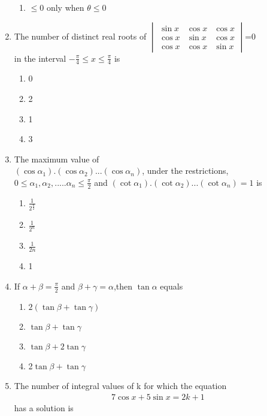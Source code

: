 \begin{enumerate}[label=\arabic*.,ref=\thesubsection.\theenumi]
\begin{enumerate}
       \item $\leq0$ only when $\theta\leq0$
   \end{enumerate}
   \item The number of distinct real roots of 
   $\begin{vmatrix}
   \sin{x} & \cos{x}  & \cos{x} \\ \cos{x} & \sin{x} & \cos{x} \\ \cos{x} & \cos{x} & \sin{x} 
   \end{vmatrix}$=0 \\
   in the interval $-\frac{\pi}{4}\leq x\leq \frac{\pi}{4}$ is 
   \begin{enumerate}
       \item 0
       \item 2
       \item 1
       \item 3
   \end{enumerate}
   \item The  maximum value of\\ $(\cos{\alpha_1}).(\cos{\alpha_2})...(\cos{\alpha_n})$, under the restrictions,
   $0\leq\alpha_1,\alpha_2,.....\alpha_n\leq{\frac{\pi}{2}}$ and $(\cot{\alpha_1}).(\cot{\alpha_2})...(\cot{\alpha_n}) = 1$
  is
   \begin{enumerate}
       \item $\frac{1}{2^{\frac{n}{2}}}$
       \item $\frac{1}{2^n}$
       \item $\frac{1}{2n}$
       \item 1
   \end{enumerate}
   \item If $\alpha+\beta =\frac{\pi}{2}$ and $\beta +\gamma =\alpha$,then $\tan{\alpha}$ equals
   \begin{enumerate}
       \item $2(\tan{\beta} + \tan{\gamma})$
       \item $\tan{\beta} + \tan{\gamma}$
       \item $\tan{\beta} +2\tan{\gamma}$
       \item 2$\tan{\beta} +\tan{\gamma}$
   \end{enumerate}
   \item The number of integral values of  k for which the equation 
   \begin{align}
       7 \cos{x}+5\sin{x}= 2k + 1
   \end{align} 
   has a solution is 
   \begin{enumerate}

\end{enumerate}
\end{enumerate}
